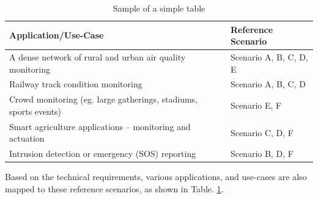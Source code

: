 %
\begin{table}[t!]
\centering
\caption{Sample of a simple table}
\vspace*{0.2cm}
\label{p1_tab:refScenarioApplications}
\begin{tabular}{|l|l|}
\hline
\textbf{Application/Use-Case} & \textbf{Reference   Scenario} \\
\hline \hline
A dense network of rural and urban air   quality monitoring & Scenario A, B, C, D, E \\\hline
Railway track condition monitoring & Scenario A, B, C, D \\\hline
Crowd monitoring (eg. large gatherings, stadiums, sports events) & Scenario E, F \\\hline
Smart agriculture applications – monitoring   and actuation & Scenario C, D, F \\\hline
Intrusion detection or emergency (SOS)   reporting & Scenario B, D, F\\
\hline
\end{tabular}
\end{table}
%
Based on the technical requirements, various applications, and use-cases are also mapped to these reference scenarios, as shown in Table. \ref{p1_tab:refScenarioApplications}.

